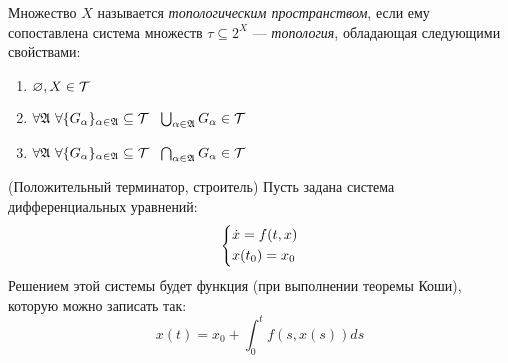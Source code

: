 \begin{definition}
	Множество $X$ называется \textit{топологическим пространством}, если ему сопоставлена система множеств $\tau \subseteq 2^X$ --- \textit{топология}, обладающая следующими свойствами:
	\begin{enumerate}
		\item $\varnothing, X \in \mathcal{T}$
		
		\item $\forall \mathfrak{A}\ \forall \{G_\alpha\}_{\alpha \in \mathfrak{A}} \subseteq \mathcal{T}\ \ \bigcup_{\alpha \in \mathfrak{A}} G_\alpha \in \mathcal{T}$
		
		\item $\forall \mathfrak{A}\ \forall \{G_\alpha\}_{\alpha \in \mathfrak{A}} \subseteq \mathcal{T}\ \ \bigcap_{\alpha \in \mathfrak{A}} G_\alpha \in \mathcal{T}$
	\end{enumerate}
\end{definition}

\begin{example} (Положительный терминатор, строитель)
	Пусть задана система дифференциальных уравнений:
	$$
		\left\{ \begin{aligned} 
			&{\dot{x} = f(t, x)}
			\\
			&{x(t_0) = x_0}
		 \end{aligned} \right.
	$$
	Решением этой системы будет функция (при выполнении теоремы Коши), которую можно записать так:
	$$
		x(t) = x_0 + \int_0^t f(s, x(s))ds
	$$
\end{example}